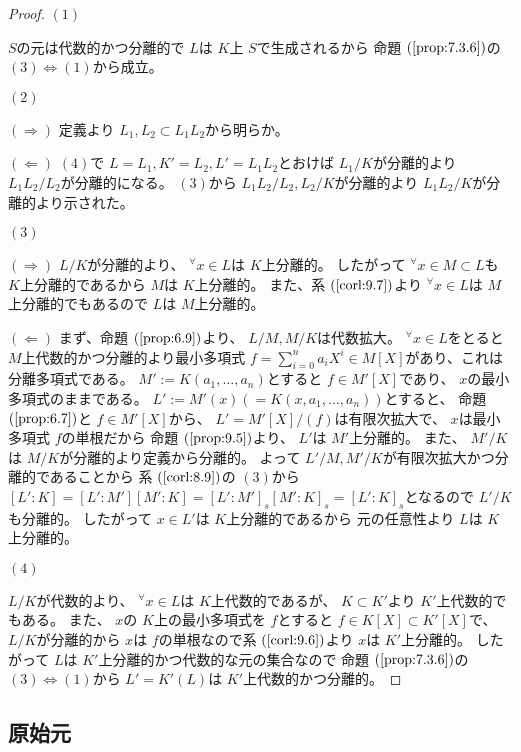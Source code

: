 \documentclass[../master_galois_theory]{subfiles}
\begin{document}
\begin{proof}
  $(1)$

  $S$の元は代数的かつ分離的で $L$は $K$上 $S$で生成されるから
  命題 $(\mathrm{\ref{prop:7.3.6}})$の $(3) \Leftrightarrow (1)$から成立。

  $(2)$

  $(\Rightarrow)$
   定義より $L_1 , L_2 \subset L_1 L_2$から明らか。

  $(\Leftarrow)$
  $(4)$で $L = L_1 , K' = L_2 , L' = L_1 L_2$とおけば
  $L_1/K$が分離的より $L_1 L_2 /L_2$が分離的になる。
  $(3)$から $L_1 L_2 /L_2 , L_2/K$が分離的より
  $L_1 L_2 / K$が分離的より示された。

  $(3)$

  $(\Rightarrow)$
  $L/K$が分離的より、 ${}^\forall x \in L$は $K$上分離的。
  したがって ${}^\forall x \in M \subset L$も $K$上分離的であるから
  $M$は $K$上分離的。
  また、系 $(\mathrm{\ref{corl:9.7}})$より
  ${}^\forall x \in L$は $M$上分離的でもあるので $L$は $M$上分離的。

  $(\Leftarrow)$
  まず、命題 $(\mathrm{\ref{prop:6.9}})$より、 $L/M , M/K$は代数拡大。
  ${}^\forall x \in L$をとると $M$上代数的かつ分離的より最小多項式 $f = \sum_{i=0}^n a_i X^i \in M[X]$があり、これは分離多項式である。
  $M' := K(a_1 , \dots , a_n)$とすると $f \in M'[X]$であり、 $x$の最小多項式のままである。
  $L' := M'(x) (= K(x , a_1 , \dots , a_n))$とすると、
  命題 $(\mathrm{\ref{prop:6.7}})$と $f \in M'[X]$から、
  $L' = M'[X]/(f)$は有限次拡大で、 $x$は最小多項式 $f$の単根だから
  命題 $(\mathrm{\ref{prop:9.5}})$より、 $L'$は $M'$上分離的。
  また、 $M'/K$は $M/K$が分離的より定義から分離的。
  よって $L'/M , M'/K$が有限次拡大かつ分離的であることから
  系 $(\mathrm{\ref{corl:8.9}})$の $(3)$から
  $[L':K] = [L':M'][M':K] = [L':M']_s [M':K]_s = [L':K]_s$となるので
  $L'/K$も分離的。
  したがって $x \in L'$は $K$上分離的であるから
  元の任意性より $L$は $K$上分離的。

  $(4)$

  $L/K$が代数的より、 ${}^\forall x \in L$は $K$上代数的であるが、
  $K \subset K'$より $K'$上代数的でもある。
  また、 $x$の $K$上の最小多項式を $f$とすると
  $f \in K[X] \subset K'[X]$で、 $L/K$が分離的から
  $x$は $f$の単根なので系 $(\mathrm{\ref{corl:9.6}})$より
  $x$は $K'$上分離的。
  したがって $L$は $K'$上分離的かつ代数的な元の集合なので
  命題 $(\mathrm{\ref{prop:7.3.6}})$の $(3) \Leftrightarrow (1)$から
  $L' = K'(L)$は $K'$上代数的かつ分離的。
\end{proof}

\subsection{原始元}
\end{document}
